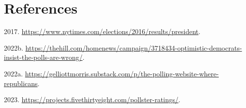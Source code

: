 \documentclass[
  11pt,
]{article}
\newlength{\cslhangindent}
\newlength{\cslentryspacingunit} %
\newenvironment{CSLReferences}[2] %
 {%
  \setlength{\parindent}{0pt}
  \ifodd #1
  \let\oldpar\par
  \def\par{\hangindent=\cslhangindent\oldpar}
  \fi
  \setlength{\parskip}{#2\cslentryspacingunit}
 }%
 {}
\begin{document}
\hypertarget{references}{%
\section*{References}\label{references}}

\hypertarget{refs}{}
\begin{CSLReferences}{1}{0}
\leavevmode{}%
2017. \url{https://www.nytimes.com/elections/2016/results/president}.

\leavevmode{}%
2022b.
\url{https://thehill.com/homenews/campaign/3718434-optimistic-democrats-insist-the-polls-are-wrong/}.

\leavevmode{}%
2022a.
\url{https://gelliottmorris.substack.com/p/the-polling-website-where-republicans}.

\leavevmode{}%
2023. \url{https://projects.fivethirtyeight.com/pollster-ratings/}.

\end{CSLReferences}
\end{document}
